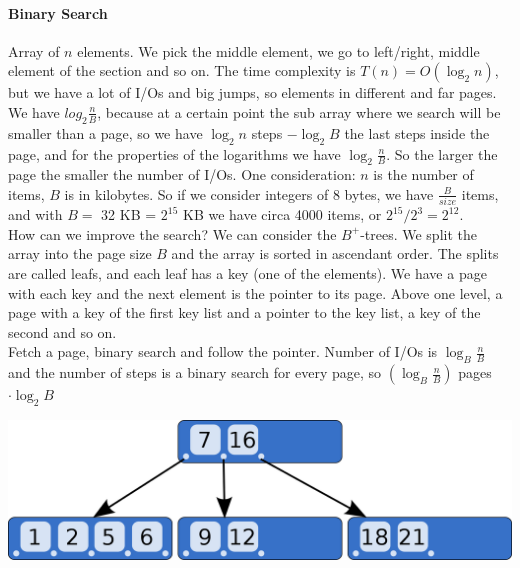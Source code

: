 \documentclass[10pt]{report}
\begin{document}
\paragraph{Binary Search} Array of $n$ elements. We pick the middle element, we go to left/right, middle element of the section and so on. The time complexity is $T(n) = O(\log_2 n)$, but we have a lot of I/Os and big jumps, so elements in different and far pages. We have $log_2 \frac{n}{B}$, because at a certain point the sub array where we search will be smaller than a page, so we have $\log_2 n$ steps $- \log_2 B$ the last steps inside the page, and for the properties of the logarithms we have $\log_2 \frac{n}{B}$. So the larger the page the smaller the number of I/Os. One consideration: $n$ is the number of items, $B$ is in kilobytes. So if we consider integers of 8 bytes, we have $\frac{B}{size}$ items, and with $B =$ 32 KB = $2^{15}$ KB we have circa 4000 items, or $2^{15}/2^3 = 2^{12}$.\\
How can we improve the search? We can consider the $B^+$-trees. We split the array into the page size $B$ and the array is sorted in ascendant order. The splits are called leafs, and each leaf has a key (one of the elements). We have a page with each key and the next element is the pointer to its page. Above one level, a page with a key of the first key list and a pointer to the key list, a key of the second and so on.\\ %
Fetch a page, binary search and follow the pointer. Number of I/Os is $\log_B \frac{n}{B}$ and the number of steps is a binary search for every page, so $(\log_B \frac{n}{B})$ pages $\cdot \log_2 B$
\begin{center}
	\includegraphics[scale=0.25]{2.png}
\end{center}
\end{document}
